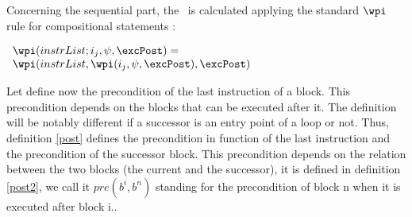 Concerning the sequential part, the \wpi \ is calculated applying the standard $\wpi$ rule for compositional statements :
\begin{center}
$ \begin{array}{l} \wpi( instrList;i_{j}, \psi,\excPost ) = \\ \wpi(instrList, \wpi(i_{j}, \psi,\excPost ),\excPost ) \end{array} $
\end{center}
Let define now the precondition of the last instruction of a block. This precondition depends on the blocks that can be executed after it. The definition will be notably different if a successor is an entry point of a loop or not. Thus, definition \ref{post} defines the precondition in function of the last instruction and the precondition of the successor block. This precondition depends on the relation between the two blocks (the current and the successor), it is defined in definition \ref{post2}, we call it $pre(b^{i}, b^{n})$ standing for the precondition of block n when it is executed after block i..
 


